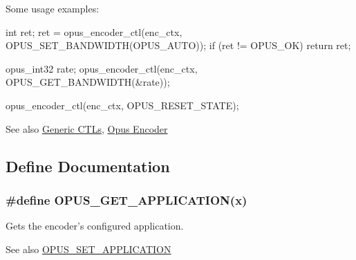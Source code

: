 Some usage examples:


\begin{DoxyCode}
 int ret;
 ret = opus_encoder_ctl(enc_ctx, OPUS_SET_BANDWIDTH(OPUS_AUTO));
 if (ret != OPUS_OK) return ret;

 opus_int32 rate;
 opus_encoder_ctl(enc_ctx, OPUS_GET_BANDWIDTH(&rate));

 opus_encoder_ctl(enc_ctx, OPUS_RESET_STATE);
\end{DoxyCode}


\begin{DoxySeeAlso}{See also}
\hyperlink{group__opus__genericctls}{Generic CTLs}, \hyperlink{group__opus__encoder}{Opus Encoder} 
\end{DoxySeeAlso}


\subsection{Define Documentation}
\hypertarget{group__opus__encoderctls_ga062ebbc209caf6832fe4a309a459fd4c}{
\subsubsection[{OPUS\_\-GET\_\-APPLICATION}]{\setlength{\rightskip}{0pt plus 5cm}\#define OPUS\_\-GET\_\-APPLICATION(x)}}
\label{group__opus__encoderctls_ga062ebbc209caf6832fe4a309a459fd4c}


Gets the encoder's configured application. \begin{DoxySeeAlso}{See also}
\hyperlink{group__opus__encoderctls_ga18fa17dae52ff8f3eaea314204bf1a36}{OPUS\_\-SET\_\-APPLICATION} 
\end{DoxySeeAlso}

